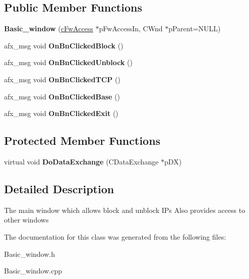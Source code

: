 \subsection*{Public Member Functions}
\begin{DoxyCompactItemize}
\item 
\hypertarget{class_basic__window_ae4b70715ce8e59b6a6b94c4753e25fbb}{}{\bfseries Basic\+\_\+window} (\hyperlink{classc_fw_access}{c\+Fw\+Access} $\ast$p\+Fw\+Access\+In, C\+Wnd $\ast$p\+Parent=N\+U\+L\+L)\label{class_basic__window_ae4b70715ce8e59b6a6b94c4753e25fbb}

\item 
\hypertarget{class_basic__window_ab1979f288ca0de48bc348d8d37450467}{}afx\+\_\+msg void {\bfseries On\+Bn\+Clicked\+Block} ()\label{class_basic__window_ab1979f288ca0de48bc348d8d37450467}

\item 
\hypertarget{class_basic__window_a5fe3e664c30e5263f2df87fe60fc67ff}{}afx\+\_\+msg void {\bfseries On\+Bn\+Clicked\+Unblock} ()\label{class_basic__window_a5fe3e664c30e5263f2df87fe60fc67ff}

\item 
\hypertarget{class_basic__window_af97c8931121c6616291104cfe46ba470}{}afx\+\_\+msg void {\bfseries On\+Bn\+Clicked\+T\+C\+P} ()\label{class_basic__window_af97c8931121c6616291104cfe46ba470}

\item 
\hypertarget{class_basic__window_ae7476ec09bd3524b93aa34db07b5e620}{}afx\+\_\+msg void {\bfseries On\+Bn\+Clicked\+Base} ()\label{class_basic__window_ae7476ec09bd3524b93aa34db07b5e620}

\item 
\hypertarget{class_basic__window_a0088cb1d49f8234e93fd51ee4bed0419}{}afx\+\_\+msg void {\bfseries On\+Bn\+Clicked\+Exit} ()\label{class_basic__window_a0088cb1d49f8234e93fd51ee4bed0419}

\end{DoxyCompactItemize}
\subsection*{Protected Member Functions}
\begin{DoxyCompactItemize}
\item 
\hypertarget{class_basic__window_a7ba1ea061979fb4fc4a08dcd07f11fb1}{}virtual void {\bfseries Do\+Data\+Exchange} (C\+Data\+Exchange $\ast$p\+D\+X)\label{class_basic__window_a7ba1ea061979fb4fc4a08dcd07f11fb1}

\end{DoxyCompactItemize}


\subsection{Detailed Description}
The main window which allows block and unblock I\+Ps Also provides access to other windows 

The documentation for this class was generated from the following files\+:\begin{DoxyCompactItemize}
\item 
Basic\+\_\+window.\+h\item 
Basic\+\_\+window.\+cpp\end{DoxyCompactItemize}
